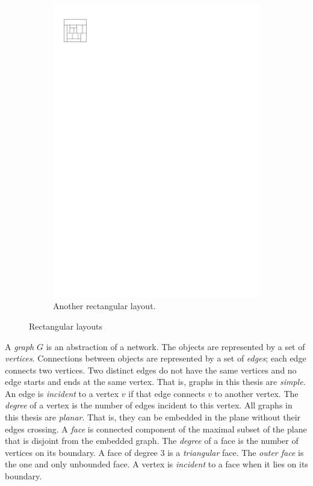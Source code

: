 \begin{figure}[b]
\begin{subfigure}[b]{0.45 \textwidth}
        \includegraphics[scale=1]{rectangularDuals/img/vertonesided}
        \caption{Another rectangular layout.}
        \label{fig:intr:vertonesided}
      \end{subfigure}
      \caption{Rectangular layouts}
      \label{fig:intr:graphs}
  \end{figure}

  A \emph{graph} $G$ is an abstraction of a network. The objects are represented by a set of \emph{vertices}.
  Connections between objects are represented by a set of \emph{edges}; each edge connects two vertices.
  Two distinct edges do not have the same vertices and no edge starts and ends at the same vertex.
  That is, graphs in this thesis are \emph{simple}. An edge is \emph{incident} to a vertex $v$ if that edge connects $v$ to another vertex.
  The \emph{degree} of a vertex is the number of edges incident to this vertex.
  All graphs in this thesis are \emph{planar}.
  That is, they can be embedded in the plane without their edges crossing. A \emph{face} is connected component of the maximal subset of the plane that is disjoint from the embedded graph. The \emph{degree} of a face is the number of vertices on its boundary.
  A face of degree $3$ is a \emph{triangular} face. The \emph{outer face} is the one and only unbounded face.
  A vertex is \emph{incident} to a face when it lies on its boundary.

